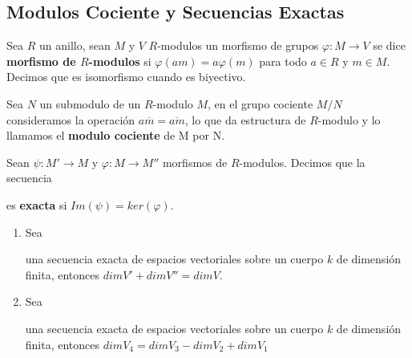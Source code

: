 \documentclass{article}
\begin{document}
\subsection{Modulos Cociente y Secuencias Exactas}
\noindent Sea $R$ un anillo, sean $M$ y $V$ $R$-modulos un morfismo de grupos $\varphi:M\to V$ se
dice \textbf{morfismo de $R$-modulos} si $\varphi(am)=a\varphi(m)$ para todo $a\in R$ y $m\in M$.
Decimos que es isomorfismo cuando es biyectivo.

\vspace{4mm}
\noindent Sea $N$ un submodulo de un $R$-modulo $M$, en el grupo cociente $M/N$ consideramos la
operación $a\overline{m}=\overline{am}$, lo que da estructura de $R$-modulo y lo llamamos el
\textbf{modulo cociente} de M por N.
\begin{dfn}
    Sean $\psi:M'\to M$ y $\varphi:M\to M''$ morfismos de $R$-modulos. Decimos que la secuencia
    
    \centerline{
    }
    \noindent es \textbf{exacta} si $Im(\psi)=ker(\varphi)$.
\end{dfn}
\begin{prop}\hspace{1mm}
    \begin{enumerate}
        \item Sea
    
        \centerline{
        }
        \noindent una secuencia exacta de espacios vectoriales sobre un cuerpo $k$ de dimensión 
        finita, entonces $dim V'+dim V''=dim V$.

        \item Sea
        
        \centerline{
        }
        \noindent una secuencia exacta de espacios vectoriales sobre un cuerpo $k$ de dimensión 
        finita, entonces $dim V_{4}=dim V_{3}-dim V_{2}+dim V_{1}$
    \end{enumerate}    
\end{prop}
\end{document}
